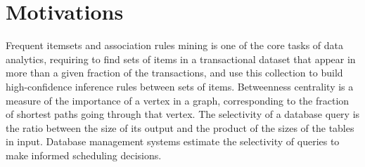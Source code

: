 %
%

\section{Motivations}

Frequent itemsets and association rules mining is one of the core tasks of data
analytics, requiring to find sets of items in a transactional dataset that
appear in more than a given fraction of the transactions, and use this
collection to build high-confidence inference rules between sets of items.
Betweenness centrality is a measure of the
importance of a vertex in a graph, corresponding to the fraction of shortest
paths going through that vertex. 
The selectivity of a database query is the ratio between the size of its output
and the product of the sizes of the tables in input. Database management systems
estimate the selectivity of queries to make informed scheduling decisions.

